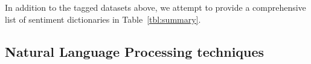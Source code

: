 In addition to the tagged datasets above, we attempt to provide a comprehensive list of sentiment dictionaries in Table~\ref{tbl:summary}.







\subsection{Natural Language Processing techniques}
\label{subsec:nlp}

